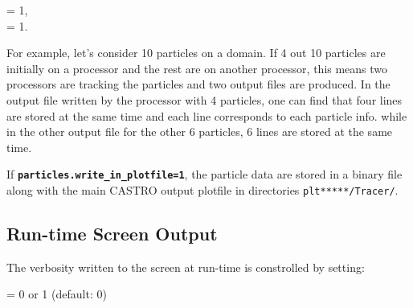 \vspace{0.1in}
= 1,\\
     = 1.
\vspace{0.1in}

\noindent For example, let's consider 10 particles on a domain.  If 4 out 10 particles are initially on a processor and the rest are on another processor, this means two processors are tracking the particles and two output files are produced. In the output file written by the processor with 4 particles, one can find that four lines are stored at the same time and each line corresponds to each particle info. while in the other output file for the other 6 particles, 6 lines are stored at the same time. 



\vspace{0.05in}

\noindent If {\tt {\bf particles.write\_in\_plotfile=1}}, the particle data are stored in a binary file along with the main CASTRO output plotfile in directories {\tt plt*****/Tracer/}. 
\vspace{0.05in}




\subsection{Run-time Screen Output}

The verbosity written to the screen at run-time is constrolled by setting:

 = 0 or 1 (default: 0)\\
